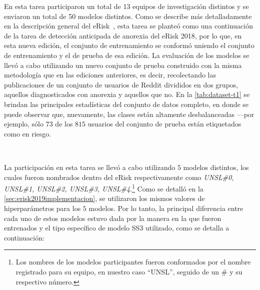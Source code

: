 En esta tarea participaron un total de 13 equipos de investigación distintos y se enviaron un total de 50 modelos distintos.
Como se describe más detalladamente en la descripción general del eRisk~\cite{losadaetal2019}, esta tarea se planteó como una continuación de la tarea de detección anticipada de anorexia del eRisk 2018, por lo que, en esta nueva edición, el conjunto de entrenamiento se conformó uniendo el conjunto de entrenamiento y el de prueba de esa edición.
La evaluación de los modelos se llevó a cabo utilizando un nuevo conjunto de prueba construido con la misma metodología que en las ediciones anteriores, es decir, recolectando las publicaciones de un conjunto de usuarios de Reddit divididos en dos grupos, aquellos diagnosticados con anorexia y aquellos que no.
En la \autoref{tab:dataset-t1} se brindan las principales estadísticas del conjunto de datos completo, en donde se puede observar que, nuevamente, las clases están altamente desbalanceadas ---por ejemplo, sólo $73$ de los $815$ usuarios del conjunto de prueba están etiquetados como en riesgo.


\

La participación en esta tarea se llevó a cabo utilizando $5$ modelos distintos, los cuales fueron nombrados dentro del eRisk respectivamente como \emph{UNSL\#0, UNSL\#1, UNSL\#2, UNSL\#3, UNSL\#4}.\footnote{Los nombres de los modelos participantes fueron conformados por el nombre registrado para su equipo, en nuestro caso ``UNSL'', seguido de un \# y su respectivo número.} 
Como se detalló en la \autoref{sec:erisk2019implementacion}, se utilizaron los mismos valores de hiperparámetros para los $5$ modelos. Por lo tanto, la principal diferencia entre cada uno de estos modelos estuvo dada por la manera en la que fueron entrenados y el tipo específico de modelo SS3 utilizado, como se detalla a continuación:

